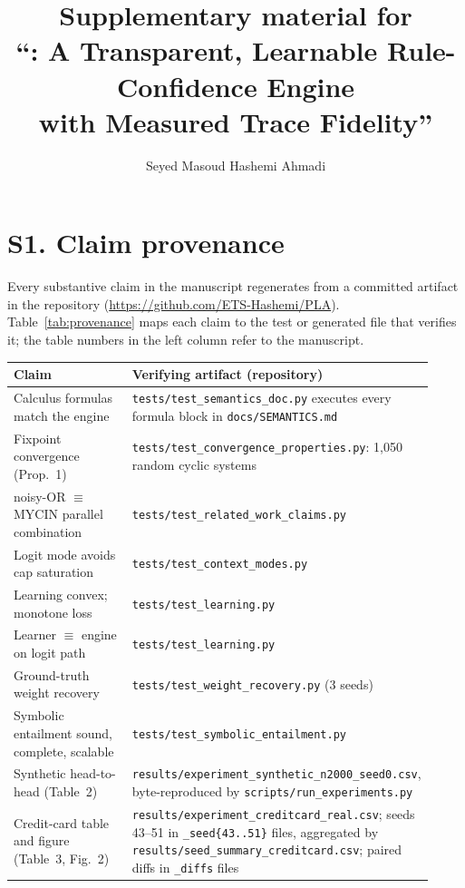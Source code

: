 \documentclass[11pt]{article}
\title{Supplementary material for\\
``\pla: A Transparent, Learnable Rule-Confidence Engine\\
with Measured Trace Fidelity''}
\author{Seyed Masoud Hashemi Ahmadi}
\date{}
\begin{document}
\maketitle

\section*{S1. Claim provenance}

Every substantive claim in the manuscript regenerates from a committed
artifact in the repository (\url{https://github.com/ETS-Hashemi/PLA}).
Table~\ref{tab:provenance} maps each claim to the test or generated
file that verifies it; the table numbers in the left column refer to
the manuscript.

\begin{table}[h]
\centering
{\footnotesize
\begin{tabular}{p{0.36\linewidth}p{0.56\linewidth}}
\toprule
Claim & Verifying artifact (repository)\\
\midrule
Calculus formulas match the engine & \texttt{tests/test\_semantics\_doc.py} executes every formula block in \texttt{docs/SEMANTICS.md}\\
Fixpoint convergence (Prop.~1) & \texttt{tests/test\_convergence\_properties.py}: 1{,}050 random cyclic systems\\
noisy-OR $\equiv$ MYCIN parallel combination & \texttt{tests/test\_related\_work\_claims.py}\\
Logit mode avoids cap saturation & \texttt{tests/test\_context\_modes.py}\\
Learning convex; monotone loss & \texttt{tests/test\_learning.py}\\
Learner $\equiv$ engine on logit path & \texttt{tests/test\_learning.py}\\
Ground-truth weight recovery & \texttt{tests/test\_weight\_recovery.py} (3 seeds)\\
Symbolic entailment sound, complete, scalable & \texttt{tests/test\_symbolic\_entailment.py}\\
Synthetic head-to-head (Table~2) & \texttt{results/experiment\_synthetic\_n2000\_seed0.csv}, byte-reproduced by \texttt{scripts/run\_experiments.py}\\
Credit-card table and figure (Table~3, Fig.~2) & \texttt{results/experiment\_creditcard\_real.csv}; seeds 43--51 in \texttt{\_seed\{43..51\}} files, aggregated by \texttt{results/seed\_summary\_creditcard.csv}; paired diffs in \texttt{\_diffs} files\\

\end{tabular}}
\end{table}
\end{document}
